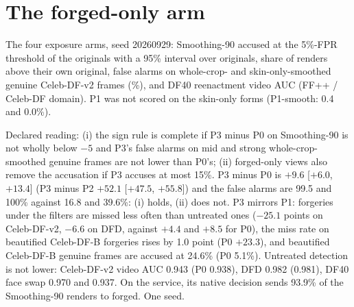 \documentclass[10pt]{article}
\begin{document}
\section{The forged-only arm}
\label{sec:p3}
\begin{table}[H]
\centering
\caption{The four exposure arms, seed 20260929: Smoothing-90 accused at the 5\%-FPR threshold of the originals with a 95\%
interval over originals, share of renders above their own original, false alarms on whole-crop- and skin-only-smoothed genuine
Celeb-DF-v2 frames (\%), and DF40 reenactment video AUC (FF++ / Celeb-DF domain). P1 was not scored on the skin-only forms
(P1-smooth: 0.4 and 0.0\%).}
\label{tab:p3}
\scriptsize
\begin{adjustbox}{max width=\linewidth}\end{adjustbox}
\end{table}
Declared reading: (i) the sign rule is complete if P3 minus P0 on Smoothing-90 is not wholly below $-5$ and P3's false alarms on
mid and strong whole-crop-smoothed genuine frames are not lower than P0's; (ii) forged-only views also remove the accusation if
P3 accuses at most 15\%. P3 minus P0 is $+9.6$ [$+6.0$, $+13.4$] (P3 minus P2 $+52.1$ [$+47.5$, $+55.8$]) and the false alarms are
99.5 and 100\% against 16.8 and 39.6\%: (i) holds, (ii) does not. P3 mirrors P1: forgeries under the filters are missed less often
than untreated ones ($-25.1$ points on Celeb-DF-v2, $-6.6$ on DFD, against $+4.4$ and $+8.5$ for P0), the miss rate on beautified
Celeb-DF-B forgeries rises by 1.0 point (P0 $+23.3$), and beautified Celeb-DF-B genuine frames are accused at 24.6\% (P0 5.1\%).
Untreated detection is not lower: Celeb-DF-v2 video AUC 0.943 (P0 0.938), DFD 0.982 (0.981), DF40 face swap 0.970 and 0.937. On
the service, its native decision sends 93.9\% of the Smoothing-90 renders to forged. One seed.
\end{document}
